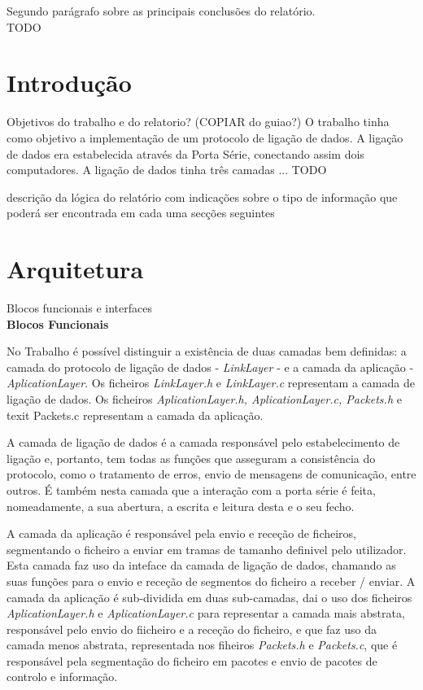 \documentclass[a4paper, 11pt]{article}
\begin{document}
Segundo parágrafo sobre as principais conclusões do relatório.\\
TODO
\newpage

\section{Introdução}

Objetivos do trabalho e do relatorio? (COPIAR do guiao?)
O trabalho tinha como objetivo a implementação de um protocolo de ligação de dados.
A ligação de dados era estabelecida através da Porta Série, conectando assim dois computadores.
A ligação de dados tinha três camadas ... TODO

descrição da lógica do relatório com indicações sobre o tipo de informação que poderá ser encontrada em cada uma secções seguintes
\newpage

\section{Arquitetura}

Blocos funcionais e interfaces\\

\large\textbf{Blocos Funcionais}\\
\normalsize 

No Trabalho é possível distinguir a existência de duas camadas bem definidas:  a camada do protocolo de ligação de dados - \textit{LinkLayer} - e a camada da aplicação - \textit{AplicationLayer}.
Os ficheiros \textit{LinkLayer.h} e  \textit{LinkLayer.c} representam a camada de ligação de dados. Os ficheiros \textit{AplicationLayer.h, AplicationLayer.c, Packets.h} e \\texit{ Packets.c} representam a camada da aplicação.

A camada de ligação de dados é a camada responsável pelo estabelecimento de ligação e, portanto, tem todas as funções que asseguram a consistência do protocolo, como o tratamento de erros, envio de mensagens de comunicação, entre outros. É também nesta camada que a interação com a porta série é feita, nomeadamente, a sua abertura, a escrita e leitura desta e o seu fecho.

A camada da aplicação é responsável pela envio e receção de ficheiros, segmentando o ficheiro a enviar em tramas de tamanho definivel pelo utilizador. Esta camada faz uso da inteface da camada de ligação de dados, chamando as suas funções para o envio e receção de segmentos do ficheiro a receber / enviar. A camada da aplicação é sub-dividida em duas sub-camadas, dai o uso dos ficheiros \textit{AplicationLayer.h} e \textit{AplicationLayer.c} para representar a camada mais abstrata, responsável pelo envio do fiicheiro e a receção do ficheiro, e que faz uso da camada menos abstrata, representada nos fiheiros  \textit{Packets.h} e \textit{Packets.c}, que é responsável pela segmentação do ficheiro em pacotes e envio de pacotes de controlo e informação.\\
\end{document}

